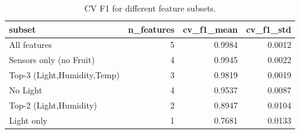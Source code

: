 \begin{table}
\caption{CV F1 for different feature subsets.}
\label{tab:featsel}
\begin{tabular}{lrrr}
\toprule
subset & n\_features & cv\_f1\_mean & cv\_f1\_std \\
\midrule
All features & 5 & 0.9984 & 0.0012 \\
Sensors only (no Fruit) & 4 & 0.9945 & 0.0022 \\
Top-3 (Light,Humidity,Temp) & 3 & 0.9819 & 0.0019 \\
No Light & 4 & 0.9537 & 0.0087 \\
Top-2 (Light,Humidity) & 2 & 0.8947 & 0.0104 \\
Light only & 1 & 0.7681 & 0.0133 \\
\bottomrule
\end{tabular}
\end{table}
